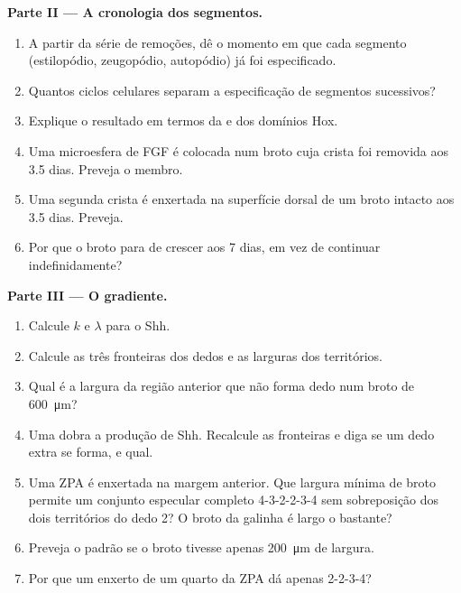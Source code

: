 \begin{problem}
\medskip
\noindent\textbf{Parte II --- A cronologia dos segmentos.}
\begin{enumerate}[resume]
  \item A partir da série de remoções, dê o momento em que cada
        segmento (estilopódio, zeugopódio, autopódio) já foi
        especificado.
  \item Quantos ciclos celulares separam a especificação de segmentos
        sucessivos?
  \item Explique o resultado em termos da  e dos
        domínios Hox.
  \item Uma microesfera de FGF é colocada num broto cuja crista foi
        removida aos 3.5 dias. Preveja o membro.
  \item Uma segunda crista é enxertada na superfície dorsal de um broto
        intacto aos 3.5 dias. Preveja.
  \item Por que o broto para de crescer aos 7 dias, em vez de continuar
        indefinidamente?
\end{enumerate}

\medskip
\noindent\textbf{Parte III --- O gradiente.}
\begin{enumerate}[resume]
  \item Calcule $k$ e $\lambda$ para o Shh.
  \item Calcule as três fronteiras dos dedos e as larguras dos
        territórios.
  \item Qual é a largura da região anterior que não forma dedo num broto
        de \qty{600}{\micro m}?
  \item Uma  dobra a produção de Shh. Recalcule as fronteiras e
        diga se um dedo extra se forma, e qual.
  \item Uma ZPA é enxertada na margem anterior. Que largura mínima de
        broto permite um conjunto especular completo 4-3-2-2-3-4 sem
        sobreposição dos dois territórios do dedo 2? O broto da galinha
        é largo o bastante?
  \item Preveja o padrão se o broto tivesse apenas \qty{200}{\micro m}
        de largura.
  \item Por que um enxerto de um quarto da ZPA dá apenas 2-2-3-4?
\end{enumerate}


\end{problem}
